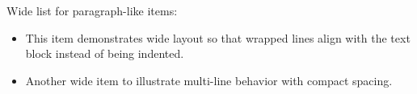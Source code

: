 \noindent Wide list for paragraph-like items:
\par
\begin{itemize}[wide,nosep]
  \item This item demonstrates wide layout so that wrapped lines align with the text block instead of being indented.
  \item Another wide item to illustrate multi-line behavior with compact spacing.
\end{itemize}
